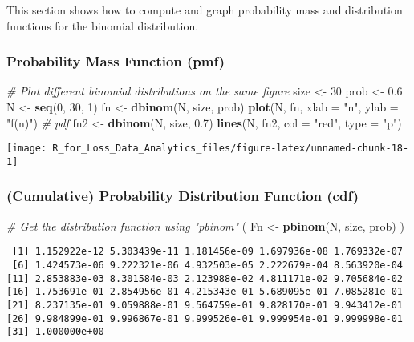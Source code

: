 \documentclass[]{book}
\newenvironment{Shaded}{\begin{snugshade}}{\end{snugshade}}
\newcommand{\KeywordTok}[1]{\textcolor[rgb]{0.13,0.29,0.53}{\textbf{#1}}}
\newcommand{\DataTypeTok}[1]{\textcolor[rgb]{0.13,0.29,0.53}{#1}}
\newcommand{\DecValTok}[1]{\textcolor[rgb]{0.00,0.00,0.81}{#1}}
\newcommand{\FloatTok}[1]{\textcolor[rgb]{0.00,0.00,0.81}{#1}}
\newcommand{\StringTok}[1]{\textcolor[rgb]{0.31,0.60,0.02}{#1}}
\newcommand{\CommentTok}[1]{\textcolor[rgb]{0.56,0.35,0.01}{\textit{#1}}}
\newcommand{\NormalTok}[1]{#1}
\theoremstyle{definition}
\theoremstyle{definition}
\theoremstyle{definition}
\theoremstyle{remark}
\begin{document}
This section shows how to compute and graph probability mass and
distribution functions for the binomial distribution.

\subsubsection{Probability Mass Function
(pmf)}\label{probability-mass-function-pmf-2}

\begin{Shaded}
\begin{Highlighting}[]
\CommentTok{# Plot different binomial distributions on the same figure}
\NormalTok{size <-}\StringTok{ }\DecValTok{30}
\NormalTok{prob <-}\StringTok{ }\FloatTok{0.6}
\NormalTok{N <-}\StringTok{ }\KeywordTok{seq}\NormalTok{(}\DecValTok{0}\NormalTok{, }\DecValTok{30}\NormalTok{, }\DecValTok{1}\NormalTok{)}
\NormalTok{fn <-}\StringTok{ }\KeywordTok{dbinom}\NormalTok{(N, size, prob)}
\KeywordTok{plot}\NormalTok{(N, fn, }\DataTypeTok{xlab =} \StringTok{"n"}\NormalTok{, }\DataTypeTok{ylab =} \StringTok{"f(n)"}\NormalTok{)  }\CommentTok{# pdf}
\NormalTok{fn2 <-}\StringTok{ }\KeywordTok{dbinom}\NormalTok{(N, size, }\FloatTok{0.7}\NormalTok{)}
\KeywordTok{lines}\NormalTok{(N, fn2, }\DataTypeTok{col =} \StringTok{"red"}\NormalTok{, }\DataTypeTok{type =} \StringTok{"p"}\NormalTok{)}
\end{Highlighting}
\end{Shaded}

\begin{center}\texttt{[image: R\_for\_Loss\_Data\_Analytics\_files/figure-latex/unnamed-chunk-18-1]} \end{center}

\subsubsection{(Cumulative) Probability Distribution Function
(cdf)}\label{cumulative-probability-distribution-function-cdf-2}

\begin{Shaded}
\begin{Highlighting}[]
\CommentTok{# Get the distribution function using "pbinom"}
\NormalTok{( Fn <-}\StringTok{ }\KeywordTok{pbinom}\NormalTok{(N, size, prob) )}
\end{Highlighting}
\end{Shaded}

\begin{verbatim}
 [1] 1.152922e-12 5.303439e-11 1.181456e-09 1.697936e-08 1.769332e-07
 [6] 1.424573e-06 9.222321e-06 4.932503e-05 2.222679e-04 8.563920e-04
[11] 2.853883e-03 8.301584e-03 2.123988e-02 4.811171e-02 9.705684e-02
[16] 1.753691e-01 2.854956e-01 4.215343e-01 5.689095e-01 7.085281e-01
[21] 8.237135e-01 9.059888e-01 9.564759e-01 9.828170e-01 9.943412e-01
[26] 9.984899e-01 9.996867e-01 9.999526e-01 9.999954e-01 9.999998e-01
[31] 1.000000e+00
\end{verbatim}
\end{document}
